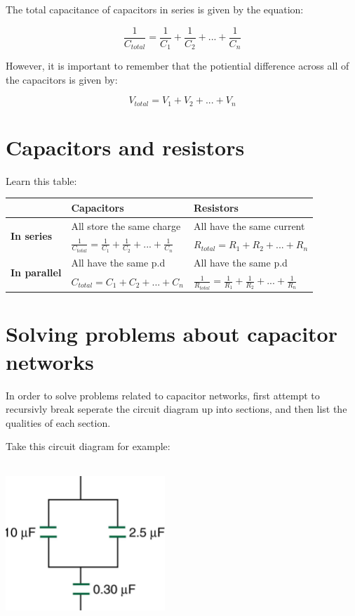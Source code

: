 \documentclass{article}
\begin{document}
The total capacitance of capacitors in series is given by the equation:

\[
	\frac{1}{C_{total}} = \frac{1}{C_1} + \frac{1}{C_2} + ... + \frac{1}{C_n}
\]

However, it is important to remember that the potiential difference across all
of the capacitors is given by:

\[
	V_{total} = V_1 + V_2 + ... + V_n
\]

\section*{Capacitors and resistors}

Learn this table:

\def\arraystretch{1.5}
\begin{tabular}{|l|l|l|}
	\hline
	& {\bf Capacitors} & {\bf Resistors} \\ \hline

	\multirow{2}{*}{\bf In series} & All store the same charge & All have the 
	same current \\
	& $\frac{1}{C_{total}} = \frac{1}{C_1} + \frac{1}{C_2} + ... + 
	\frac{1}{C_n}$ & $R_{total} = R_1 + R_2 + ... + R_n$\\ \hline

	\multirow{2}{*}{\bf In parallel} & All have the same p.d & All have the same
	p.d \\
	& $C_{total} = C_1 + C_2 + ... + C_n$ & 
	$\frac{1}{R_{total}} = \frac{1}{R_1} + \frac{1}{R_2} + ... +
	\frac{1}{R_n}$\\ \hline

\end{tabular}

\section*{Solving problems about capacitor networks}

In order to solve problems related to capacitor networks, first attempt to
recursivly break seperate the circuit diagram up into sections, and then list
the qualities of each section.

\newpage

Take this circuit diagram for example:

\begin{center}
	\includegraphics[height=6cm, width=6cm]{diagram}
\end{center}
\end{document}
